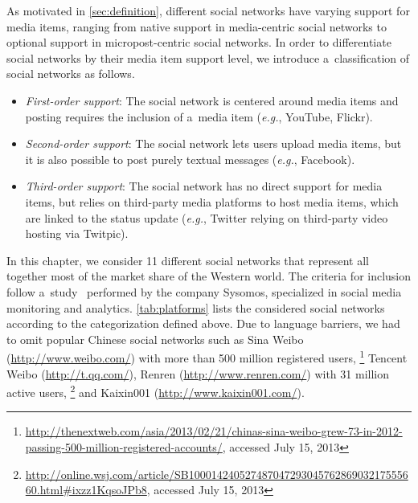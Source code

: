 {As motivated in \autoref{sec:definition},
different social networks have varying support
for media items, ranging from native support
in media-centric social networks
to optional support in micropost-centric social networks.
In order to differentiate social networks by their
media item support level,
we introduce a~classification of social networks as follows.

\begin{itemize}
  \item \emph{First-order support}:
        The social network is centered around media items
        and posting requires the inclusion of a~media item
        (\emph{e.g.}, YouTube, Flickr).
  \item \emph{Second-order support}:
        The social network lets users upload media items,
        but it is also possible to post purely textual messages
        (\emph{e.g.}, Facebook).
  \item \emph{Third-order support}:
        The social network has no direct support for media items,
        but relies on third-party media platforms
        to host media items, which are linked to the status update
        (\emph{e.g.}, Twitter relying on third-party video hosting via Twitpic).
\end{itemize}

In this chapter, we consider 11 different social networks
that represent all together most of the market share
of the Western world.
The criteria for inclusion follow
a~study~\cite{levine2011howpeopleshare}
performed by the company Sysomos, specialized in social media
monitoring and analytics.
\autoref{tab:platforms} lists the considered social networks according to the categorization defined above.
Due to language barriers, we had to omit
popular Chinese social networks
such as Sina Weibo (\url{http://www.weibo.com/}) with more than 
500 million registered users,%
\footnote{\url{http://thenextweb.com/asia/2013/02/21/chinas-sina-weibo-grew-73-in-2012-passing-500-million-registered-accounts/},
accessed July 15, 2013}
Tencent Weibo (\url{http://t.qq.com/}),
Renren (\url{http://www.renren.com/}) with 31 million active users,%
\footnote{\url{http://online.wsj.com/article/SB10001424052748704729304576286903217555660.html\#ixzz1KqsoJPb8},
accessed July 15, 2013}
and Kaixin001 (\url{http://www.kaixin001.com/}).


}

